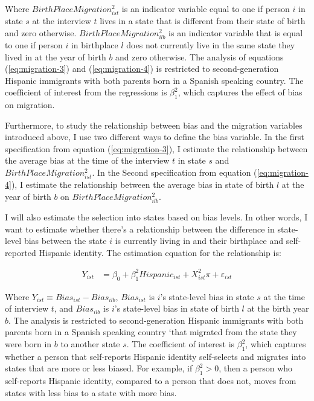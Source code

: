 \documentclass[12pt, fullpage]{article}
\begin{document}
Where $BirthPlaceMigration_{ist}^2$ is an indicator variable equal to one if person $i$ in state $s$ at the interview $t$ lives in a state that is different from their state of birth and zero otherwise. $BirthPlaceMigration_{ilb}^2$ is an indicator variable that is equal to one if person $i$ in birthplace $l$ does not currently live in the same state they lived in at the year of birth $b$ and zero otherwise. The analysis of equations (\ref{eq:migration-3}) and (\ref{eq:migration-4}) is restricted to second-generation Hispanic immigrants with both parents born in a Spanish speaking country. The coefficient of interest from the regressions is $\beta_1^2$, which captures the effect of bias on migration.

Furthermore, to study the relationship between bias and the migration variables introduced above, I use two different ways to define the bias variable. In the first specification from equation (\ref{eq:migration-3}), I estimate the relationship between the average bias at the time of the interview $t$ in state $s$ and $BirthPlaceMigration_{ist}^2$. In the Second specification from equation (\ref{eq:migration-4}), I estimate the relationship between the average bias in state of birth $l$ at the year of birth $b$ on $BirthPlaceMigration_{ilb}^2$. 

I will also estimate the selection into states based on bias levels. In other words, I want to estimate whether there's a relationship between the difference in state-level bias between the state $i$ is currently living in and their birthplace and self-reported Hispanic identity. The estimation equation for the relationship is:

\begin{align}
Y_{ist} &= \beta_0 + \beta_1^2 Hispanic_{ist} +
                   X_{ist}^2\pi
                   + \varepsilon_{ist} \label{eq:migration-5}
\end{align}

Where $Y_{ist} \equiv Bias_{ist} -  Bias_{ilb}$, $Bias_{ist}$ is $i$'s state-level bias in state $s$ at the time of interview $t$, and  $Bias_{ilb}$ is $i$'s state-level bias in state of birth $l$ at the birth year $b$. The analysis is restricted to second-generation Hispanic immigrants with both parents born in a Spanish speaking country `that migrated from the state they were born in $b$ to another state $s$. The coefficient of interest is $\beta_1^2$, which captures whether a person that self-reports Hispanic identity self-selects and migrates into states that are more or less biased. For example, if $\beta_1^2>0$, then a person who self-reports Hispanic identity, compared to a person that does not, moves from states with less bias to a state with more bias.
\end{document}
